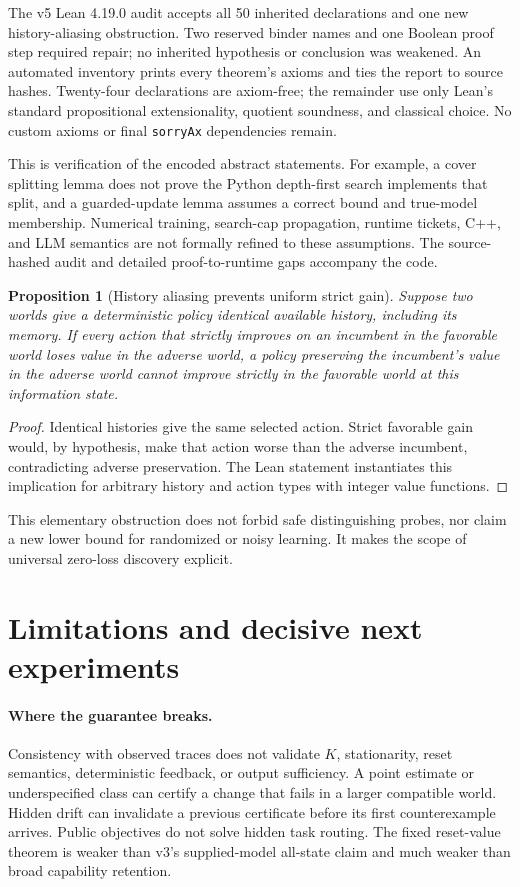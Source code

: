 \documentclass[10pt,twocolumn]{article}
\newtheorem{proposition}[theorem]{Proposition}
\begin{document}
The v5 Lean 4.19.0 audit accepts all 50 inherited declarations and one new
history-aliasing obstruction. Two reserved binder names and one Boolean proof
step required repair; no inherited hypothesis or conclusion was weakened.
An automated inventory prints every theorem's axioms and ties the report to
source hashes. Twenty-four declarations are axiom-free; the remainder use only
Lean's standard propositional extensionality, quotient soundness, and classical
choice. No custom axioms or final \texttt{sorryAx} dependencies remain.

This is verification of the encoded abstract statements. For example, a cover
splitting lemma does not prove the Python depth-first search implements that
split, and a guarded-update lemma assumes a correct bound and true-model
membership. Numerical training, search-cap propagation, runtime tickets, C++, and
LLM semantics are not formally refined to these assumptions. The source-hashed
audit and detailed proof-to-runtime gaps accompany the code.

\begin{proposition}[History aliasing prevents uniform strict gain]
Suppose two worlds give a deterministic policy identical available history,
including its memory. If every action that strictly improves on an incumbent in
the favorable world loses value in the adverse world, a policy preserving the
incumbent's value in the adverse world cannot improve strictly in the favorable
world at this information state.
\end{proposition}
\begin{proof}
Identical histories give the same selected action. Strict favorable gain would,
by hypothesis, make that action worse than the adverse incumbent, contradicting
adverse preservation. The Lean statement instantiates this implication for
arbitrary history and action types with integer value functions.
\end{proof}
This elementary obstruction does not forbid safe distinguishing probes, nor
claim a new lower bound for randomized or noisy learning. It makes the scope of
universal zero-loss discovery explicit.




\section{Limitations and decisive next experiments}
\paragraph{Where the guarantee breaks.}
Consistency with observed traces does not validate $K$, stationarity, reset
semantics, deterministic feedback, or output sufficiency. A point estimate or
underspecified class can certify a change that fails in a larger compatible
world. Hidden drift can invalidate a previous certificate before its first
counterexample arrives. Public objectives do not solve hidden task routing.
The fixed reset-value theorem is weaker than v3's supplied-model all-state
claim and much weaker than broad capability retention.
\end{document}
